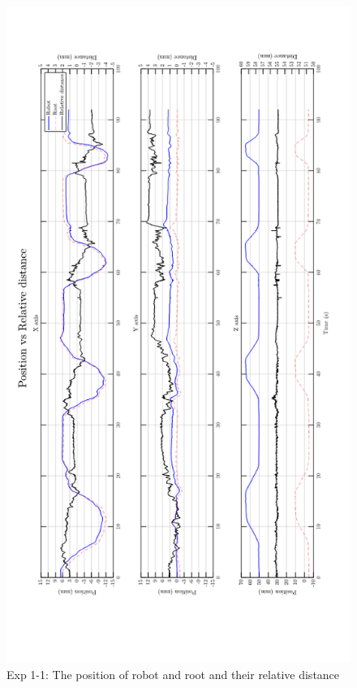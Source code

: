 \begin{figure}[htbp]
\begin{center}
\includegraphics[width=1\linewidth]{Images/exp/exp1_1_1.png}
\caption{Exp 1-1: The position of robot and root and their relative distance}
\label{fig: exp1_1_1}
\end{center}
\end{figure}	
